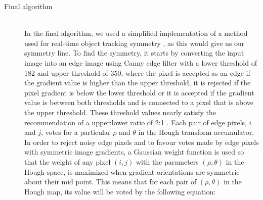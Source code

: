\begin{description}
	\item[Final algorithm] \hfill \\
	In the final algorithm, we used a simplified implementation of a method used for real-time object tracking symmetry \cite{li2006real}, as this would give us our symmetry line. To find the symmetry, it starts by converting the input image into an edge image using Canny edge filter with a lower threshold of 182 and upper threshold of 350, where the pixel is accepted as an edge if the gradient value is higher than the upper threshold, it is rejected if the pixel gradient is below the lower threshold or it is accepted if the gradient value is between both thresholds and is connected to a pixel that is above the upper threshold. These threshold values nearly satisfy the recommendation of a upper:lower ratio of 2:1 \cite{OCV}. Each pair of edge pixels, $i$ and $j$, votes for a particular $\rho$ and $\theta$ in the Hough transform accumulator. In order to reject noisy edge pixels and to favour votes made by edge pixels with symmetric image gradients, a Gaussian weight function is used so that the weight of any pixel $(i,j)$ with the parameters $(\rho,\theta)$ in the Hough space, is maximized when gradient orientations are symmetric about their mid point. This means that for each pair of $(\rho,\theta)$  in the Hough map, its value will be voted by the following equation:


\end{description}
